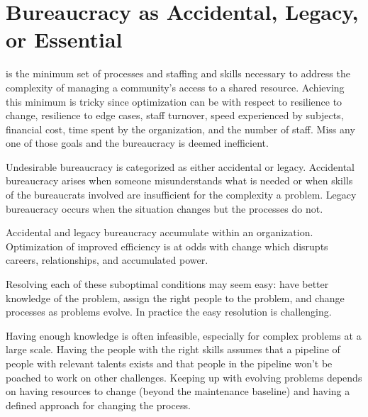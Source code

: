\section{Bureaucracy as Accidental, Legacy, or Essential}

\iftoggle{glossarysubstitutionworks}{\Gls{essential bureaucracy}}{Essential bureaucracy}
\iftoggle{glossaryinmargin}{\marginpar{[Glossary]}}{} is the minimum set of processes and staffing and skills necessary to address the complexity of managing a community's access to a \gls{shared resource}.
\iftoggle{glossaryinmargin}{\marginpar{[Glossary]}}{} Achieving this minimum is tricky since optimization can be with respect to resilience to change, resilience to edge cases, staff turnover, speed experienced by subjects, financial cost, time spent by the organization, and the number of staff. Miss any one of those goals and the bureaucracy is deemed inefficient.

Undesirable bureaucracy is categorized as either accidental or legacy. Accidental bureaucracy arises when someone misunderstands what is needed or when skills of the bureaucrats involved are insufficient for the complexity a problem. Legacy bureaucracy occurs when the situation changes but the processes do not. 

Accidental and legacy bureaucracy accumulate within an organization. Optimization of improved efficiency is at odds with change which disrupts careers, relationships, and accumulated power. 

Resolving each of these suboptimal conditions may seem easy: have better knowledge of the problem, assign the right people to the problem, and change processes as problems evolve.  In practice the easy resolution is challenging. 

Having enough knowledge is often infeasible, especially for complex problems at a large scale. Having the people with the right skills assumes that a pipeline of people with relevant talents exists and that people in the pipeline won't be poached to work on other challenges. Keeping up with evolving problems depends on having resources to change (beyond the maintenance baseline) and having a defined approach for changing the process. 